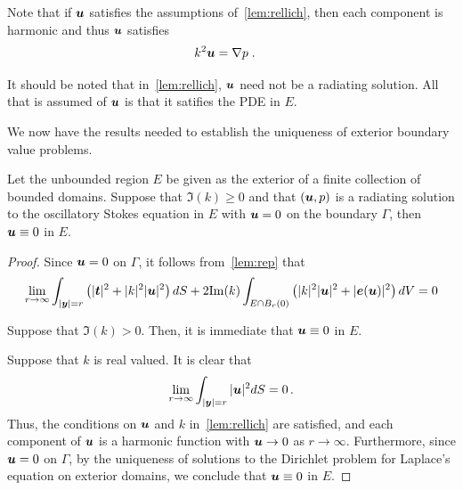 \begin{remark} \label{rmk:harmu}
  Note that if ${\boldsymbol u}$ satisfies the assumptions
  of~\cref{lem:rellich}, then each component is harmonic
  and thus ${\boldsymbol u}$ satisfies
\begin{align}
k^2 {\boldsymbol u} &= \nabla p \label{eq:massconsred} \; .
\end{align}
\end{remark}

\begin{remark}
  It should be noted that in~\cref{lem:rellich}, ${\boldsymbol u}$ need
  not be a radiating solution. All that is assumed of ${\boldsymbol u}$
  is that it satifies the PDE in $E$.
\end{remark}

We now have the results needed to establish the
uniqueness of exterior boundary value problems.

\begin{thrm}
  \label{thrm:unique_dir_ext}
  Let the unbounded region $E$ be given as the exterior
  of a finite collection of bounded domains.
  Suppose that $\Im(k)\geq 0$ and 
  that $({\boldsymbol u},p)$ is a radiating solution to the oscillatory Stokes
  equation in $E$ with ${\boldsymbol u} =0$ on the boundary $\Gamma$, then
  ${\boldsymbol u} \equiv 0$ in $E$.
\end{thrm}

\begin{proof}
Since ${\boldsymbol u} = 0$ on $\Gamma$, it follows from~\cref{lem:rep} that
\begin{equation}
\lim_{r\to\infty}
\int_{|{\boldsymbol y}|=r} \left( |{\boldsymbol t}|^2 + |k|^2 |{\boldsymbol u}|^2 \right) dS +
2 {\textrm{\textup{Im}}}(k) \int_{E \cap B_{r}(0)} \left(|k|^2 |{\boldsymbol u}|^2 + |{\boldsymbol e}({\boldsymbol u})|^2 \right)
dV = 0 \nonumber
\end{equation}

Suppose that $\Im(k) > 0$. Then, it is immediate that
${\boldsymbol u} \equiv 0$ in $E$.

Suppose that $k$ is real valued. It is clear that
\begin{equation}
\lim_{r\to\infty} \int_{|{\boldsymbol y}|=r} |{\boldsymbol u}|^2 dS = 0 \, . \nonumber
\end{equation}
Thus, the conditions on ${\boldsymbol u}$ and $k$ in~\cref{lem:rellich}
are satisfied, and each component of ${\boldsymbol u}$ is a harmonic function
with ${\boldsymbol u} \to 0$ as $r \to \infty$. Furthermore, since ${\boldsymbol u}=0$ on
$\Gamma$, by the uniqueness of solutions to the
Dirichlet problem for Laplace's equation
on exterior domains, we conclude that ${\boldsymbol u} \equiv 0$
in $E$.
\end{proof}

